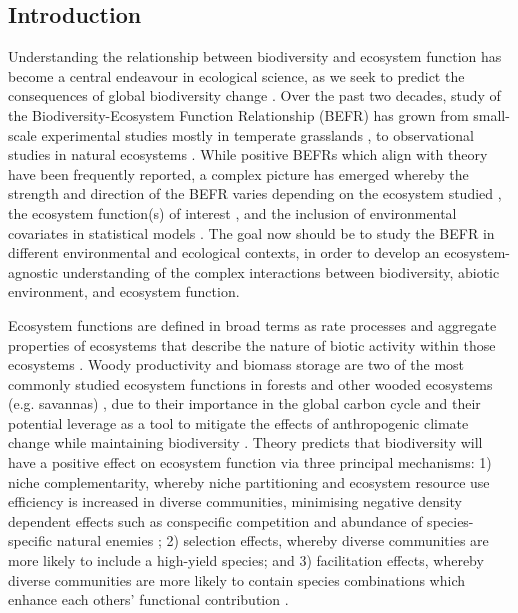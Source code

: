 \begin{refsection}
\section{Introduction}
\label{befr:sec:intro}

Understanding the relationship between biodiversity and ecosystem function has become a central endeavour in ecological science, as we seek to predict the consequences of global biodiversity change \citep{Naeem2012}. Over the past two decades, study of the Biodiversity-Ecosystem Function Relationship (BEFR) has grown from small-scale experimental studies mostly in temperate grasslands \citep{Cardinale2009, Tilman1994, Tilman2014}, to observational studies in natural ecosystems \citep{Plas2019}. While positive BEFRs which align with theory have been frequently reported, a complex picture has emerged whereby the strength and direction of the BEFR varies depending on the ecosystem studied \citep{Liang2016}, the ecosystem function(s) of interest \citep{Hector2007}, and the inclusion of environmental covariates in statistical models \citep{Vila2005}. The goal now should be to study the BEFR in different environmental and ecological contexts, in order to develop an ecosystem-agnostic understanding of the complex interactions between biodiversity, abiotic environment, and ecosystem function.

Ecosystem functions are defined in broad terms as rate processes and aggregate properties of ecosystems that describe the nature of biotic activity within those ecosystems \citep{Jax2005}. Woody productivity and biomass storage are two of the most commonly studied ecosystem functions in forests and other wooded ecosystems (e.g. savannas) \citep{Brockerhoff2017}, due to their importance in the global carbon cycle \citep{Pan2011} and their potential leverage as a tool to mitigate the effects of anthropogenic climate change while maintaining biodiversity \citep{Pichancourt2013}. Theory predicts that biodiversity will have a positive effect on ecosystem function via three principal mechanisms: 1) niche complementarity, whereby niche partitioning and ecosystem resource use efficiency is increased in diverse communities, minimising negative density dependent effects such as conspecific competition and abundance of species-specific natural enemies \citep{Barry2019}; 2) selection effects, whereby diverse communities are more likely to include a high-yield species; and 3) facilitation effects, whereby diverse communities are more likely to contain species combinations which enhance each others' functional contribution \citep{Wright2017}. 


\end{refsection}
